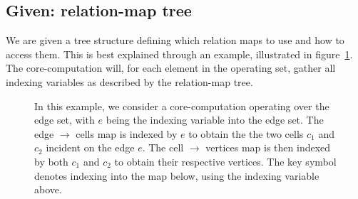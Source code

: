 \subsection{Given: relation-map tree}
We are given a tree structure defining which relation maps to use and how to access them. This is best explained through an example, illustrated in figure~\ref{fig:relation-tree}. The core-computation will, for each element in the operating set, gather all indexing variables as described by the relation-map tree.


\begin{figure}
    \newcommand{\keyicon}{}

    \caption{
    In this example, we consider a core-computation operating over the edge set, with $e$ being the indexing variable into the edge set.
    The edge $\rightarrow$ cells map is indexed by $e$ to obtain the the two cells $c_1$ and $c_2$ incident on the edge $e$. The cell $\rightarrow$ vertices map is then indexed by both $c_1$ and $c_2$ to obtain their respective vertices. The key symbol denotes indexing into the map below, using the indexing variable above.
    }
    \label{fig:relation-tree}
\end{figure}


